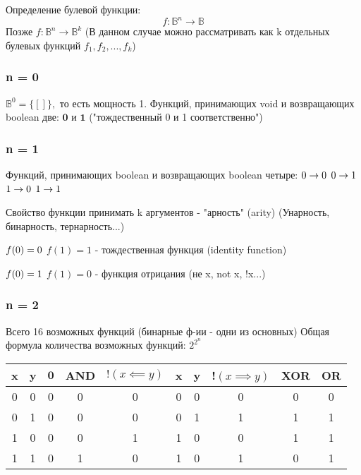\documentclass{article}
\begin{document}
Определение булевой функции:
\[ f: \mathbb{B}^{n} \longrightarrow \mathbb{B}\]
Позже \( f: \mathbb{B}^{n} \longrightarrow \mathbb{B}^{k}\)
(В данном случае можно рассматривать как k отдельных булевых функций $f_1, f_2, ..., f_k$)

\subsubsection{n = 0}
$ \mathbb{B}^{0} = \{[]\}, $ то есть мощность 1.
Функций, принимающих void и возвращающих boolean две: $\mathbf{0}$ и $\mathbf{1}$ ("тождественный 0 и 1 соответственно") %

\subsubsection{n = 1}
Функций, принимающих boolean и возвращающих boolean четыре: \newline
$0 \rightarrow 0 \newline$
$0 \rightarrow 1 \newline$
$1 \rightarrow 0 \newline$
$1 \rightarrow 1 \newline$

Свойство функции принимать k аргументов - "арность" (arity)
(Унарность, бинарность, тернарность...)

$f(0) = 0 \newline$
$f(1) = 1$ - тождественная функция (identity function)

$f(0) = 1 \newline$
$f(1) = 0$ - функция отрицания (не x, not x, !x...)

\subsubsection{n = 2}
Всего 16 возможных функций (бинарные ф-ии - одни из основных)
Общая формула количества возможных функций: $ 2^{2^{n}}$

\begin{table}
    \centering
    \begin{tabular}{ |c|c|c|c|c|c|c|c|c|c| }
        \hline
         x & y & $\mathbf{0}$ & AND & $!(x \impliedby y)$ & x & y & !$(x \implies y)$ & XOR & OR \\
         \hline
         0 & 0 & 0 & 0 & 0 & 0 & 0 & 0 & 0 & 0 \\
         0 & 1 & 0 & 0 & 0 & 0 & 1 & 1 & 1 & 1 \\
         1 & 0 & 0 & 0 & 1 & 1 & 0 & 0 & 1 & 1 \\
         1 & 1 & 0 & 1 & 0 & 1 & 0 & 1 & 0 & 1 \\
         \hline
    \end{tabular}
    \label{tab:my_label}
\end{table}
\end{document}
